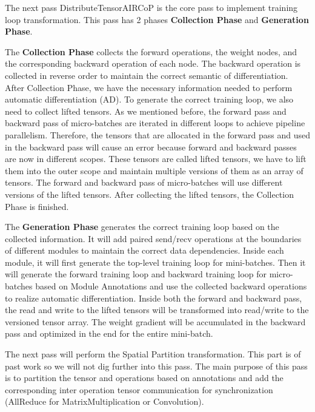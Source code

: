 \documentclass[sigplan]{acmart}\settopmatter{printfolios=true,printccs=false,printacmref=false}
\begin{document}
The next pass DistributeTensorAIRCoP is the core pass to implement training loop transformation. This pass has 2 phases \textbf{Collection Phase} and \textbf{Generation Phase}.\par
 The \textbf{Collection Phase} collects the forward operations, the weight nodes, and the corresponding backward operation of each node. The backward operation is collected in reverse order to maintain the correct semantic of differentiation. After Collection Phase, we have the necessary information needed to perform automatic differentiation (AD). To generate the correct training loop, we also need to collect lifted tensors. As we mentioned before, the forward pass and backward pass of micro-batches are iterated in different loops to achieve pipeline parallelism. Therefore, the tensors that are allocated in the forward pass and used in the backward pass will cause an error because forward and backward passes are now in different scopes. These tensors are called lifted tensors, we have to lift them into the outer scope and maintain multiple versions of them as an array of tensors. The forward and backward pass of micro-batches will use different versions of the lifted tensors. After collecting the lifted tensors, the Collection Phase is finished.\par
 The \textbf{Generation Phase} generates the correct training loop based on the collected information. It will add paired send/recv operations at the boundaries of different modules to maintain the correct data dependencies. Inside each module, it will first generate the top-level training loop for mini-batches. Then it will generate the forward training loop and backward training loop for micro-batches based on Module Annotations and use the collected backward operations to realize automatic differentiation. Inside both the forward and backward pass, the read and write to the lifted tensors will be transformed into read/write to the versioned tensor array. The weight gradient will be accumulated in the backward pass and optimized in the end for the entire mini-batch.\par
 The next pass will perform the Spatial Partition transformation. This part is of past work so we will not dig further into this pass. The main purpose of this pass is to partition the tensor and operations based on annotations and add the corresponding inter operation tensor communication for synchronization (AllReduce for MatrixMultiplication or Convolution).\par
\end{document}
